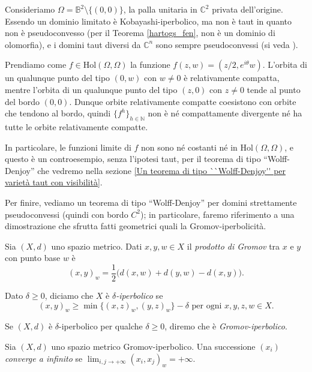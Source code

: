 \begin{ex} \label{servetaut}
    Consideriamo $\Omega=\mathbb{B}^2\setminus\{(0,0)\}$, la palla unitaria in $\mathbb{C}^2$ privata dell'origine. Essendo un dominio limitato è Kobayashi-iperbolico, ma non è taut in quanto non è pseudoconvesso (per il Teorema \ref{hartogs_fen}, non è un dominio di olomorfia), e i domini taut diversi da $\mathbb{C}^n$ sono sempre pseudoconvessi (si veda \cite[Theorem F]{Wu}).

    Prendiamo come $f\in\text{Hol}(\Omega,\Omega)$ la funzione $f(z,w)=(z/2,e^{i\theta}w)$. L'orbita di un qualunque punto del tipo $(0,w)$ con $w\not=0$ è relativamente compatta, mentre l'orbita di un qualunque punto del tipo $(z,0)$ con $z\not=0$ tende al punto del bordo $(0,0)$. Dunque orbite relativamente compatte coesistono con orbite che tendono al bordo, quindi $\{f^h\}_{h\in\mathbb{N}}$ non è né compattamente divergente né ha tutte le orbite relativamente compatte.
    
    In particolare, le funzioni limite di $f$ non sono né costanti né in $\text{Hol}(\Omega,\Omega)$, e questo è un controesempio, senza l'ipotesi taut, per il teorema di tipo ``Wolff-Denjoy'' che vedremo nella sezione \ref{Un teorema di tipo ``Wolff-Denjoy'' per varietà taut con visibilità}.
\end{ex}

Per finire, vediamo un teorema di tipo ``Wolff-Denjoy'' per domini strettamente pseudoconvessi (quindi con bordo $C^2$); in particolare, faremo riferimento a una dimostrazione che sfrutta fatti geometrici quali la Gromov-iperbolicità.

\begin{defn}
    Sia $(X,d)$ uno spazio metrico. Dati $x,y,w \in X$ il \textit{prodotto di Gromov} tra $x$ e $y$ con punto base $w$ è
    $$(x,y)_w=\frac{1}{2}\big(d(x,w)+d(y,w)-d(x,y)\big).$$
    
    Dato $\delta \ge 0$, diciamo che $X$ è \textit{$\delta$-iperbolico} se
    $$(x,y)_w \ge \min\{(x,z)_w,(y,z)_w\}-\delta\text{ per ogni }x,y,z,w \in X.$$

    Se $(X,d)$ è $\delta$-iperbolico per qualche $\delta \ge 0$, diremo che è \textit{Gromov-iperbolico}.
\end{defn}

\begin{defn}
    Sia $(X,d)$ uno spazio metrico Gromov-iperbolico. Una successione $(x_i)$ \textit{converge a infinito} se $\displaystyle\lim_{i,j\rightarrow+\infty}(x_i,x_j)_w=+\infty$.
\end{defn}

